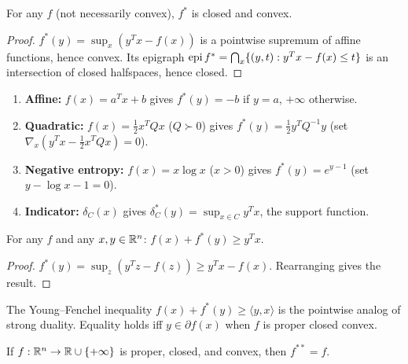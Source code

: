 \documentclass[11pt,a4paper]{article}
\begin{document}
\begin{proposition}
\label{prop:conjugate-convex}
For any $f$ (not necessarily convex), $f^*$ is closed and convex.
\end{proposition}

\begin{proof}
$f^*(y) = \sup_x (y^T x - f(x))$ is a pointwise supremum of affine
functions, hence convex.  Its epigraph $\operatorname{epi} f^* = \bigcap_x \{(y,t) :
y^T x - f(x) \le t\}$ is an intersection of closed halfspaces, hence closed.
\end{proof}

\begin{example}
\label{ex:conjugates}
\begin{enumerate}[label=(\alph*)]
  \item \textbf{Affine:} $f(x) = a^T x + b$ gives $f^*(y) = -b$ if $y = a$,
        $+\infty$ otherwise.
  \item \textbf{Quadratic:} $f(x) = \frac{1}{2} x^T Q x$ ($Q \succ 0$)
        gives $f^*(y) = \frac{1}{2} y^T Q^{-1} y$
        (set $\nabla_x(y^T x - \frac{1}{2} x^T Q x) = 0$).
  \item \textbf{Negative entropy:} $f(x) = x \log x$ ($x > 0$) gives
        $f^*(y) = e^{y-1}$ (set $y - \log x - 1 = 0$).
  \item \textbf{Indicator:} $\delta_C(x)$ gives $\delta_C^*(y) =
        \sup_{x \in C} y^T x$, the support function.
\end{enumerate}
\end{example}

\begin{theorem}
\label{thm:fenchel-inequality}
For any $f$ and any $x, y \in \mathbb{R}^n$: $f(x) + f^*(y) \ge y^T x$.
\end{theorem}

\begin{proof}
$f^*(y) = \sup_z(y^T z - f(z)) \ge y^T x - f(x)$.  Rearranging gives the
result.
\end{proof}

\begin{keyresult}[title={Fenchel's Inequality}]
The Young--Fenchel inequality $f(x) + f^*(y) \ge \langle y, x \rangle$
is the pointwise analog of strong duality.  Equality holds iff
$y \in \partial f(x)$ when $f$ is proper closed convex.
\end{keyresult}

\begin{theorem}
\label{thm:biconjugate}
If $f : \mathbb{R}^n \to \mathbb{R} \cup \{+\infty\}$ is proper, closed, and convex, then
$f^{**} = f$.
\end{theorem}
\end{document}
